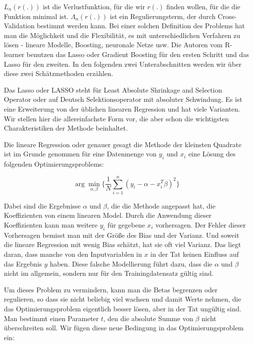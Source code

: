 \documentclass[12pt,a4paper,twoside]{scrartcl}
\numberwithin{equation}{section}
\newcounter{subsubsubsection}[subsubsection]
\begin{document}
\noindent
$L_n(r(.))$ ist die Verlustfunktion, für die wir $r(.)$ finden wollen, für die die Funktion minimal ist. $\Lambda_n(r(.))$ ist ein Regulierungsterm, der durch Cross-Validation bestimmt werden kann. Bei einer solchen Definition des Problems hat man die Möglichkeit und die Flexibilität, es mit unterschiedlichen Verfahren zu lösen - lineare Modelle, Boosting, neuronale Netze usw. Die Autoren vom R-learner benutzen das Lasso oder Gradient Boosting für den ersten Schritt und das Lasso für den zweiten. In den folgenden zwei Unterabschnitten werden wir über diese zwei Schätzmethoden erzählen.\par

\label{subsubsubsec:lasso}
	Das Lasso oder LASSO steht für Least Absolute Shrinkage and Selection Operator oder auf Deutsch Selektionsoperator mit absoluter Schwindung. Es ist eine Erweiterung von der üblichen linearen Regression und hat viele Varianten. Wir stellen hier die allereinfachste Form vor, die aber schon die wichtigsten Charakteristiken der Methode beinhaltet.\par 
	
\noindent
Die lineare Regression oder genauer gesagt die Methode der kleinsten Quadrate ist im Grunde genommen für eine Datenmenge von  $y_i$ und $x_i$ eine Lösung des folgenden Optimierungsproblems:\par	

\begin{equation}\label{eq:2.22}
	 \arg\min_{\alpha, \beta} \bigg\{ \frac{1}{N}\sum_{i=1}^{n} (y_i - \alpha - x_i^T\beta)^2 \bigg\}
\end{equation}

\noindent
Dabei sind die Ergebnisse $\alpha$ und $\beta$, die die Methode angepasst hat, die Koeffizienten von einem linearen Model. Durch die Anwendung dieser Koeffizienten kann man weitere $y_i$ für gegebene $x_i$ vorhersagen. Der Fehler dieser Vorhersagen bemisst man mit der Größe des Bias und der Varianz. Und soweit die lineare Regression mit wenig Bias schätzt, hat sie oft viel Varianz. Das liegt daran, dass manche von den Inputvariablen in $x$ in der Tat keinen Einfluss auf das Ergebnis $y$ haben. Diese falsche Modellierung führt dazu, dass die $\alpha$ und $\beta$ nicht im allgemein, sondern nur für den Trainingdatensatz gültig sind.\par 

\noindent
Um dieses Problem zu vermindern, kann man die Betas begrenzen oder regulieren, so dass sie nicht beliebig viel wachsen und damit Werte nehmen, die das Optimierungsproblem eigentlich besser lösen, aber in der Tat ungültig sind. Man bestimmt einen Parameter $t$, den die absolute Summe von $\beta$ nicht überschreiten soll\cite{tibshirani1996regression}. Wir fügen diese neue Bedingung in das Optimierungsproblem ein:\par   
\end{document}

